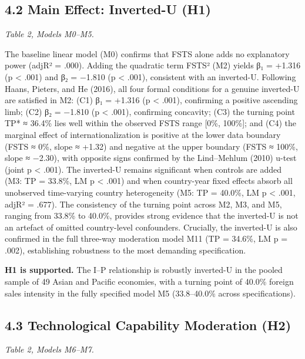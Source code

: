 \documentclass[
  12pt]{article}
\begin{document}
\hypertarget{main-effect-inverted-u-h1}{%
\subsection{4.2 Main Effect: Inverted-U
(H1)}\label{main-effect-inverted-u-h1}}

\emph{Table 2, Models M0--M5.}

The baseline linear model (M0) confirms that FSTS alone adds no
explanatory power (adjR² = .000). Adding the quadratic term FSTS² (M2)
yields β₁ = +1.316 (p \textless{} .001) and β₂ = −1.810 (p \textless{}
.001), consistent with an inverted-U. Following Haans, Pieters, and He
(2016), all four formal conditions for a genuine inverted-U are
satisfied in M2: (C1) β₁ = +1.316 (p \textless{} .001), confirming a
positive ascending limb; (C2) β₂ = −1.810 (p \textless{} .001),
confirming concavity; (C3) the turning point TP* ≈ 36.4\% lies well
within the observed FSTS range {[}0\%, 100\%{]}; and (C4) the marginal
effect of internationalization is positive at the lower data boundary
(FSTS ≈ 0\%, slope ≈ +1.32) and negative at the upper boundary (FSTS ≈
100\%, slope ≈ −2.30), with opposite signs confirmed by the Lind--Mehlum
(2010) u-test (joint p \textless{} .001). The inverted-U remains
significant when controls are added (M3: TP = 33.8\%, LM p \textless{}
.001) and when country-year fixed effects absorb all unobserved
time-varying country heterogeneity (M5: TP = 40.0\%, LM p \textless{}
.001, adjR² = .677). The consistency of the turning point across M2, M3,
and M5, ranging from 33.8\% to 40.0\%, provides strong evidence that the
inverted-U is not an artefact of omitted country-level confounders.
Crucially, the inverted-U is also confirmed in the full three-way
moderation model M11 (TP = 34.6\%, LM p = .002), establishing robustness
to the most demanding specification.

\textbf{H1 is supported.} The I--P relationship is robustly inverted-U
in the pooled sample of 49 Asian and Pacific economies, with a turning
point of 40.0\% foreign sales intensity in the fully specified model M5
(33.8--40.0\% across specifications).

\hypertarget{technological-capability-moderation-h2}{%
\subsection{4.3 Technological Capability Moderation
(H2)}\label{technological-capability-moderation-h2}}

\emph{Table 2, Models M6--M7.}
\end{document}
